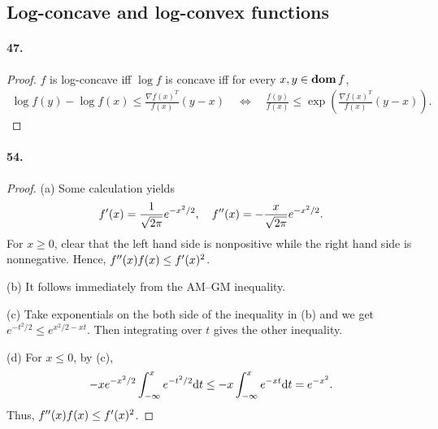 \subsection{Log-concave and log-convex functions}
  \paragraph{47.}
  \begin{proof}
    $f$ is log-concave iff $\log f$ is concave iff for every $x,y\in\operatorname{\mathbf{dom}} f$,
    \begin{align*}
      \log f(y)-\log f(x)\le \frac{\nabla f(x)^T}{f(x)}(y-x) 
      \quad\Longleftrightarrow\quad
      \frac{f(y)}{f(x)} \le \exp\left(\frac{\nabla f(x)^T}{f(x)}(y-x)\right).
    \end{align*}
  \end{proof}
  
  \paragraph{54.}
  \begin{proof}
    (a) Some calculation yields
    \[
      f^\prime(x)=\frac{1}{\sqrt{2\pi}}e^{-x^2/2},\quad
      f^{\prime\prime}(x)=-\frac{x}{\sqrt{2\pi}}e^{-x^2/2}.
    \]
    For $x\ge 0$, clear that the left hand side is nonpositive while the right
    hand side is nonnegative. Hence, $f^{\prime\prime}(x)f(x)\le f^\prime(x)^2$.\par
    (b) It follows immediately from the AM–GM inequality.\par
    (c) Take exponentials on the both side of the inequality in (b) and we get
    $e^{-t^2/2}\le e^{x^2/2-xt}$. Then integrating over $t$ gives the other
    inequality.\par
    (d) For $x\le 0$, by (c),
    \[
      -xe^{-x^2/2}\int_{-\infty}^xe^{-t^2/2}\mathrm{d} t
      \le -x\int_{-\infty}^xe^{-xt}\mathrm{d} t
      = e^{-x^2}.
    \]
    Thus, $f^{\prime\prime}(x)f(x)\le f^\prime(x)^2$.
  \end{proof}


















